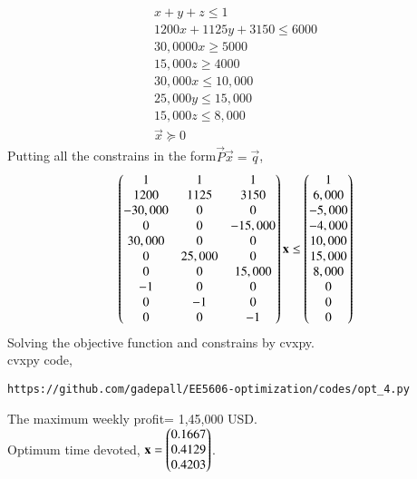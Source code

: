 \documentclass[journal,12pt,twocolumn]{IEEEtran}
\begin{document}
\begin{enumerate}
\begin{align}
x+y+z \leq 1\\
1200x+1125y+3150 \leq 6000\\
30,0000x \geq 5000\\
15,000z \geq 4000\\
30,000x \leq 10,000\\
25,000y \leq 15,000\\
15,000z \leq 8,000\\
\vec{x}\succeq 0
\end{align}
Putting all the constrains in the form$\vec{P}\vec{x}=\vec{q}$,
\begin{align}
\begin{pmatrix}1&1&1\\1200&1125&3150\\-30,000&0&0\\0&0&-15,000\\30,000&0&0\\0&25,000&0\\0&0&15,000\\-1&0&0\\0&-1&0\\0&0&-1\end{pmatrix}\mathbf{x} \leq \begin{pmatrix}1\\6,000\\-5,000\\-4,000\\10,000\\15,000\\8,000\\0\\0\\0\end{pmatrix}
\end{align}
Solving the objective function and constrains by cvxpy.\\
cvxpy code,
\begin{lstlisting}
https://github.com/gadepall/EE5606-optimization/codes/opt_4.py
\end{lstlisting}
The maximum weekly profit= 1,45,000 USD.\\
Optimum time devoted, $\mathbf{x} = \begin{pmatrix}0.1667\\ 0.4129\\ 0.4203\end{pmatrix}$.
\end{enumerate}
\end{document}
